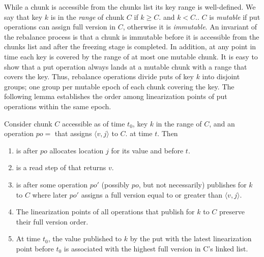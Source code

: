 While a chunk is accessible from the chunks list its key range is well-defined.
We say that key $k$ is in the \emph{range} of chunk $C$ if $k \geq C$. and $k < C.$.
$C$ is \emph{mutable} if put operations can assign full version in $C$, otherwise it is \emph{immutable}.
An invariant of the rebalance process is that 
a chunk is immutable before it is accessible from the chunks list and after the freezing stage is completed. 
In addition, at any point in time each key is covered by the range of at most one mutable chunk. 
It is easy to show that a put operation always lands at a mutable chunk with a range that covers the key.
Thus, rebalance operations divide puts of key $k$ into disjoint groups; one group per mutable epoch of each chunk covering the key.
The following lemma establishes the order among linearization points of put operations within the same epoch.
\begin{lemma}
\label{proof:put}
Consider chunk $C$ accessible as of time $t_0$, key $k$ in the range of $C$, and an
operation $po=$ that assigns $\langle v, j\rangle$ to $C$. at time $t$. Then  
\begin{enumerate}
\setlength{\itemsep}{0pt}
\setlength{\parskip}{0pt}
\item \label{proof:put:lp1}  is after $po$ allocates location $j$ for its value and before $t$.
\item \label{proof:put:lp2}  is a read step of  that returns $v$.
\item \label{proof:put:lp3}  is after some operation $po'$ (possibly $po$, but not necessarily) publishes for $k$ to $C$ where later $po'$ assigns a full version equal to or greater than $\langle v, j\rangle$.
\item \label{proof:put:lp4} The linearization points of all operations that publish for $k$ to $C$ preserve their full version order.
\item \label{proof:put:lp5} At time $t_0$, the value published to $k$ by the put with the latest linearization point before $t_0$ is associated with the highest full version in C's linked list.
\end{enumerate}
\end{lemma}




